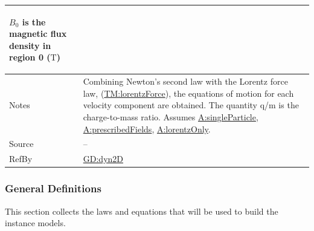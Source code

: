 \documentclass[12pt]{article}
\begin{document}
\begin{minipage}{\textwidth}
\begin{tabular}{>{\raggedright}p{}>{\raggedright\arraybackslash}p{}}
\begin{symbDescription}
              \item{${B_{0}}$ is the magnetic flux density in region 0 (${\text{T}}$)}
              \end{symbDescription}
\\ \midrule
Notes & Combining Newton's second law with the Lorentz force law, (\hyperref[TM:lorentzForce]{TM:lorentzForce}), the equations of motion for each velocity component are obtained. The quantity q/m is the charge-to-mass ratio. Assumes \hyperref[singleParticle]{A:singleParticle}, \hyperref[prescribedFields]{A:prescribedFields}, \hyperref[lorentzOnly]{A:lorentzOnly}.
        
\\ \midrule
Source & --
         
\\ \midrule
RefBy & \hyperref[GD:dyn2D]{GD:dyn2D}
        
\\ \bottomrule
\end{tabular}
\end{minipage}

\subsubsection{General Definitions}
\label{Sec:GDs}
This section collects the laws and equations that will be used to build the instance models.
\end{document}
